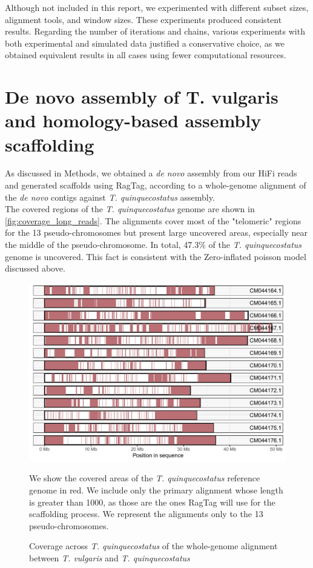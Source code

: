 Although not included in this report, we experimented with different subset sizes, alignment tools, and window sizes. These experiments produced consistent results. Regarding the number of iterations and chains, various experiments with both experimental and simulated data justified a conservative choice, as we obtained equivalent results in all cases using fewer computational resources. \\

\section*{De novo assembly of T. vulgaris and homology-based assembly scaffolding}

As discussed in Methods, we obtained a \textit{de novo} assembly from our \ac{HiFi} reads and generated scaffolds using RagTag, according to a whole-genome alignment of the \textit{de novo} contigs against \textit{T. quinquecostatus} assembly.\\

The covered regions of the \textit{T. quinquecostatus} genome are shown in \autoref{fig:coverage_long_reads}. The alignments cover most of the "telomeric" regions for the 13 pseudo-chromosomes but present large uncovered areas, especially near the middle of the pseudo-chromosome. In total, 47.3\% of the \textit{T. quinquecostatus} genome is uncovered. This fact is consistent with the Zero-inflated poisson model discussed above.\\

\begin{figure}[h]
    \begin{center}
        \includegraphics[width=\textwidth]{gfx/coverage_long_reads_tq.pdf}
        \caption{Coverage across \textit{T. quinquecostatus} of the whole-genome alignment between \textit{T. vulgaris} and \textit{T. quinquecostatus}}   
        \label{fig:coverage_long_reads}
 
    \end{center}
        \footnotesize
    We show the covered areas of the \textit{T. quinquecostatus} reference genome in red. We include only the primary alignment whose length is greater than 1000, as those are the ones RagTag will use for the scaffolding process. We represent the alignments only to the 13 pseudo-chromosomes.  
\end{figure}   

